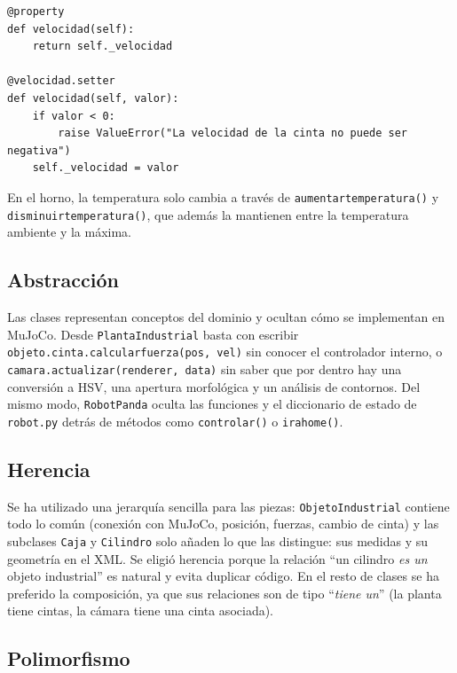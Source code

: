 \documentclass[12pt,a4paper]{article}
\renewcommand{\_}{\guionbajo\allowbreak}
\begin{document}
\begin{lstlisting}[caption={Velocidad de la cinta protegida mediante una propiedad.}]
@property
def velocidad(self):
    return self._velocidad

@velocidad.setter
def velocidad(self, valor):
    if valor < 0:
        raise ValueError("La velocidad de la cinta no puede ser negativa")
    self._velocidad = valor
\end{lstlisting}

En el horno, la temperatura solo cambia a través de \texttt{aumentar\_temperatura()} y
\texttt{disminuir\_temperatura()}, que además la mantienen entre la temperatura ambiente
y la máxima.

\subsection{Abstracción}

Las clases representan conceptos del dominio y ocultan cómo se implementan en MuJoCo. Desde
\texttt{PlantaIndustrial} basta con escribir \texttt{objeto.cinta.calcular\_fuerza(pos,
vel)} sin conocer el controlador interno, o \texttt{camara.actualizar(renderer, data)} sin
saber que por dentro hay una conversión a HSV, una apertura morfológica y un análisis de
contornos. Del mismo modo, \texttt{RobotPanda} oculta las funciones y el diccionario de
estado de \texttt{robot.py} detrás de métodos como \texttt{controlar()} o
\texttt{ir\_a\_home()}.

\subsection{Herencia}

Se ha utilizado una jerarquía sencilla para las piezas: \texttt{ObjetoIndustrial} contiene
todo lo común (conexión con MuJoCo, posición, fuerzas, cambio de cinta) y las subclases
\texttt{Caja} y \texttt{Cilindro} solo añaden lo que las distingue: sus medidas y su
geometría en el XML. Se eligió herencia porque la relación ``un cilindro \emph{es un}
objeto industrial'' es natural y evita duplicar código. En el resto de clases se ha
preferido la composición, ya que sus relaciones son de tipo ``\emph{tiene un}'' (la
planta tiene cintas, la cámara tiene una cinta asociada).

\subsection{Polimorfismo}
\end{document}
